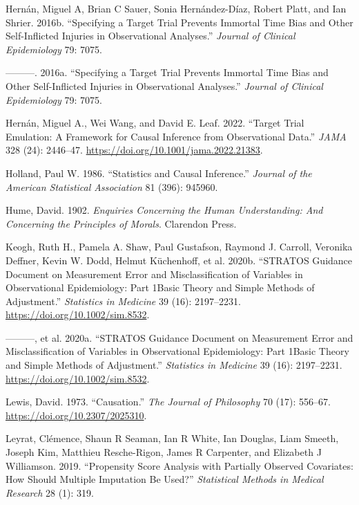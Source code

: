 \documentclass[
  singlecolumn]{report}
\newlength{\cslhangindent}
\newlength{\cslentryspacingunit} %
\newenvironment{CSLReferences}[2] %
 {%
  \setlength{\parindent}{0pt}
  \ifodd #1
  \let\oldpar\par
  \def\par{\hangindent=\cslhangindent\oldpar}
  \fi
  \setlength{\parskip}{#2\cslentryspacingunit}
 }%
 {}
\begin{document}
\begin{CSLReferences}{1}{0}
\leavevmode{}%
Hernán, Miguel A, Brian C Sauer, Sonia Hernández-Díaz, Robert Platt, and
Ian Shrier. 2016b. {``Specifying a Target Trial Prevents Immortal Time
Bias and Other Self-Inflicted Injuries in Observational Analyses.''}
\emph{Journal of Clinical Epidemiology} 79: 7075.

\leavevmode{}%
---------. 2016a. {``Specifying a Target Trial Prevents Immortal Time
Bias and Other Self-Inflicted Injuries in Observational Analyses.''}
\emph{Journal of Clinical Epidemiology} 79: 7075.

\leavevmode{}%
Hernán, Miguel A., Wei Wang, and David E. Leaf. 2022. {``Target Trial
Emulation: A Framework for Causal Inference from Observational Data.''}
\emph{JAMA} 328 (24): 2446--47.
\url{https://doi.org/10.1001/jama.2022.21383}.

\leavevmode{}%
Holland, Paul W. 1986. {``Statistics and Causal Inference.''}
\emph{Journal of the American Statistical Association} 81 (396): 945960.

\leavevmode{}%
Hume, David. 1902. \emph{Enquiries Concerning the Human Understanding:
And Concerning the Principles of Morals}. Clarendon Press.

\leavevmode{}%
Keogh, Ruth H., Pamela A. Shaw, Paul Gustafson, Raymond J. Carroll,
Veronika Deffner, Kevin W. Dodd, Helmut Küchenhoff, et al. 2020b.
{``STRATOS Guidance Document on Measurement Error and Misclassification
of Variables in Observational Epidemiology: Part 1{\textemdash}Basic
Theory and Simple Methods of Adjustment.''} \emph{Statistics in
Medicine} 39 (16): 2197--2231. \url{https://doi.org/10.1002/sim.8532}.

\leavevmode{}%
---------, et al. 2020a. {``STRATOS Guidance Document on Measurement
Error and Misclassification of Variables in Observational Epidemiology:
Part 1{\textemdash}Basic Theory and Simple Methods of Adjustment.''}
\emph{Statistics in Medicine} 39 (16): 2197--2231.
\url{https://doi.org/10.1002/sim.8532}.

\leavevmode{}%
Lewis, David. 1973. {``Causation.''} \emph{The Journal of Philosophy} 70
(17): 556--67. \url{https://doi.org/10.2307/2025310}.

\leavevmode{}%
Leyrat, Clémence, Shaun R Seaman, Ian R White, Ian Douglas, Liam Smeeth,
Joseph Kim, Matthieu Resche-Rigon, James R Carpenter, and Elizabeth J
Williamson. 2019. {``Propensity Score Analysis with Partially Observed
Covariates: How Should Multiple Imputation Be Used?''} \emph{Statistical
Methods in Medical Research} 28 (1): 319.


\end{CSLReferences}
\end{document}
